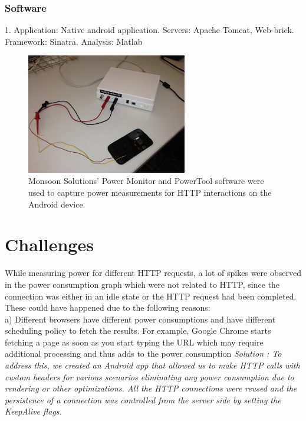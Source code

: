 \documentclass{sigplanconf}
\begin{document}
\subsubsection{Software}

1. Application: Native android application. Servers: Apache Tomcat, Web-brick. Framework: Sinatra. Analysis: Matlab\newline

\begin{figure}[ht!]
\centering
\includegraphics[width=70mm]{monitor.jpg}
\caption{Monsoon Solutions’ Power Monitor and PowerTool software were used to capture power measurements for HTTP interactions on the Android device.}
\label{fig:sp_gd_mnist}
\end{figure}

\section{ Challenges}

While measuring power for different HTTP requests, a lot of spikes were observed in the power consumption graph which were not related to HTTP, since the connection was either in an idle state or the HTTP request had been completed. These could have happened due to the following reasons: \\
a) Different browsers have different power consumptions and have different scheduling policy to fetch the results. For example, Google Chrome starts fetching a page as soon as you start typing the URL which may require additional processing and thus adds to the power consumption\newline
\it{Solution} \rm: To address this, we created an Android app that allowed us to make HTTP calls with custom headers for various scenarios eliminating any power consumption due to rendering or other optimizations. All the HTTP connections were reused and the persistence of a connection was controlled from the server side by setting the KeepAlive flags.
\end{document}
